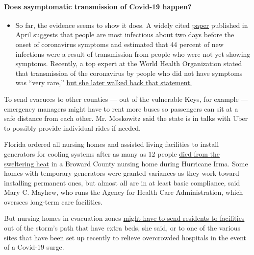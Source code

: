 \begin{itemize}
{  \paragraph{Does asymptomatic transmission of Covid-19
  happen?}\label{does-asymptomatic-transmission-of-covid-19-happen}}

  \begin{itemize}
  \tightlist
  \item
    So far, the evidence seems to show it does. A widely cited
    \href{https://www.nature.com/articles/s41591-020-0869-5}{paper}
    published in April suggests that people are most infectious about
    two days before the onset of coronavirus symptoms and estimated that
    44 percent of new infections were a result of transmission from
    people who were not yet showing symptoms. Recently, a top expert at
    the World Health Organization stated that transmission of the
    coronavirus by people who did not have symptoms was ``very rare,''
    \href{https://www.nytimes.com/2020/06/09/world/coronavirus-updates.html?action=click\&pgtype=Article\&state=default\&region=MAIN_CONTENT_3\&context=storylines_faq\#link-1f302e21}{but
    she later walked back that statement.}
  \end{itemize}
\end{itemize}

To send evacuees to other counties --- out of the vulnerable Keys, for
example --- emergency managers might have to rent more buses so
passengers can sit at a safe distance from each other. Mr. Moskowitz
said the state is in talks with Uber to possibly provide individual
rides if needed.

Florida ordered all nursing homes and assisted living facilities to
install generators for cooling systems after as many as 12 people
\href{https://www.nytimes.com/2019/08/24/us/4-charged-holywood-hills-deaths-hurricane-irma-florida.html}{died
from the sweltering heat} in a Broward County nursing home during
Hurricane Irma. Some homes with temporary generators were granted
variances as they work toward installing permanent ones, but almost all
are in at least basic compliance, said Mary C. Mayhew, who runs the
Agency for Health Care Administration, which oversees long-term care
facilities.

But nursing homes in evacuation zones
\href{https://www.nytimes.com/2019/09/03/us/hurricane-dorian-florida-evacuation.html}{might
have to send residents to facilities} out of the storm's path that have
extra beds, she said, or to one of the various sites that have been set
up recently to relieve overcrowded hospitals in the event of a Covid-19
surge.

